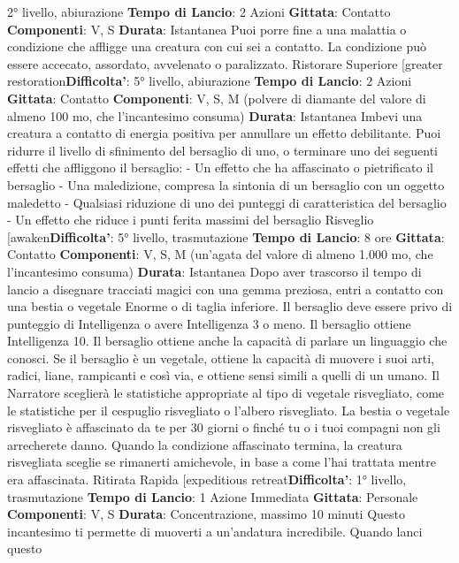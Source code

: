 \begin{multicols}{2}
2° livello, abiurazione
\textbf{Tempo di Lancio}: 2 Azioni
\textbf{Gittata}: Contatto
\textbf{Componenti}: V, S
\textbf{Durata}: Istantanea
Puoi porre fine a una malattia o condizione che affligge
una creatura con cui sei a contatto. La condizione può
essere accecato, assordato, avvelenato o paralizzato.
Ristorare Superiore
[greater restoration\textbf{Difficolta'}:
5° livello, abiurazione
\textbf{Tempo di Lancio}: 2 Azioni
\textbf{Gittata}: Contatto
\textbf{Componenti}: V, S, M (polvere di diamante del valore di
almeno 100 mo, che l’incantesimo consuma)
\textbf{Durata}: Istantanea
Imbevi una creatura a contatto di energia positiva per
annullare un effetto debilitante. Puoi ridurre il livello di
sfinimento del bersaglio di uno, o terminare uno dei
seguenti effetti che affliggono il bersaglio:
- Un effetto che ha affascinato o pietrificato il
bersaglio
- Una maledizione, compresa la sintonia di un
bersaglio con un oggetto maledetto
- Qualsiasi riduzione di uno dei punteggi di
caratteristica del bersaglio
- Un effetto che riduce i punti ferita massimi del
bersaglio
Risveglio
[awaken\textbf{Difficolta'}:
5° livello, trasmutazione
\textbf{Tempo di Lancio}: 8 ore
\textbf{Gittata}: Contatto
\textbf{Componenti}: V, S, M (un’agata del valore di almeno
1.000 mo, che l’incantesimo consuma)
\textbf{Durata}: Istantanea
Dopo aver trascorso il tempo di lancio a disegnare
tracciati magici con una gemma preziosa, entri a
contatto con una bestia o vegetale Enorme o di taglia
inferiore. Il bersaglio deve essere privo di punteggio di
Intelligenza o avere Intelligenza 3 o meno. Il bersaglio
ottiene Intelligenza 10. Il bersaglio ottiene anche la
capacità di parlare un linguaggio che conosci. Se il
bersaglio è un vegetale, ottiene la capacità di muovere i
suoi arti, radici, liane, rampicanti e così via, e ottiene
sensi simili a quelli di un umano. Il Narratore sceglierà le
statistiche appropriate al tipo di vegetale risvegliato,
come le statistiche per il cespuglio risvegliato o l’albero
risvegliato.
La bestia o vegetale risvegliato è affascinato da te per
30 giorni o finché tu o i tuoi compagni non gli
arrecherete danno. Quando la condizione affascinato
termina, la creatura risvegliata sceglie se rimanerti
amichevole, in base a come l’hai trattata mentre era
affascinata.
Ritirata Rapida
[expeditious retreat\textbf{Difficolta'}:
1° livello, trasmutazione
\textbf{Tempo di Lancio}: 1 Azione Immediata
\textbf{Gittata}: Personale
\textbf{Componenti}: V, S
\textbf{Durata}: Concentrazione, massimo 10 minuti
Questo incantesimo ti permette di muoverti a
un’andatura incredibile. Quando lanci questo

\end{multicols}
